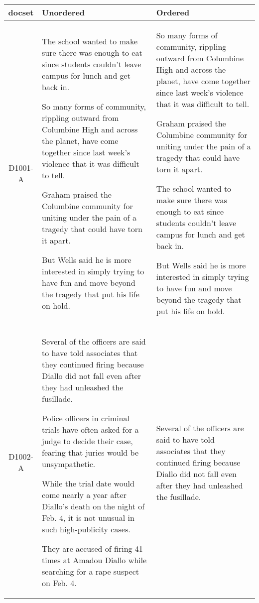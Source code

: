  \begin{table*}[ht]
     \centering
     \begin{tabular}{||c|p{6.5cm}|p{6.5cm}||} 
     \hline\hline
        docset & Unordered & Ordered \\
        \hline\hline
         D1001-A & \small The school wanted to make sure there was enough to eat since students couldn't leave campus for lunch and get back in. 
         
         So many forms of community, rippling outward from Columbine High and across the planet, have come together since last week's violence that it was difficult to tell. 
         
         Graham praised the Columbine community for uniting under the pain of a tragedy that could have torn it apart. 
         
         But Wells said he is more interested in simply trying to have fun and move beyond the tragedy that put his life on hold. & \small So many forms of community, rippling outward from Columbine High and across the planet, have come together since last week's violence that it was difficult to tell. 
         
         Graham praised the Columbine community for uniting under the pain of a tragedy that could have torn it apart. 
         
         The school wanted to make sure there was enough to eat since students couldn't leave campus for lunch and get back in. 
         
         But Wells said he is more interested in simply trying to have fun and move beyond the tragedy that put his life on hold.  \\
        \hline
        D1002-A & \small Several of the officers are said to have told associates that they continued firing because Diallo did not fall even after they had unleashed the fusillade.
        
        Police officers in criminal trials have often asked for a judge to decide their case, fearing that juries would be unsympathetic.
        
        While the trial date would come nearly a year after Diallo's death on the night of Feb. 4, it is not unusual in such high-publicity cases.
        
        They are accused of firing 41 times at Amadou Diallo while searching for a rape suspect on Feb. 4. & \small Several of the officers are said to have told associates that they continued firing because Diallo did not fall even after they had unleashed the fusillade.
        

\end{tabular}
\end{table*}

